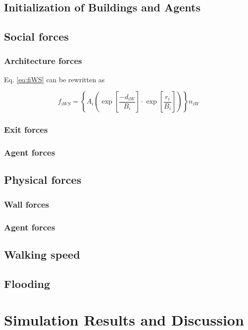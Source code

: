 \documentclass[11pt]{article}
\begin{document}
\subsection{Initialization of Buildings and Agents}
\subsection{Social forces}

\subsubsection{Architecture forces}

Eq. \eqref{eq:fiWS} can be rewritten as

\begin{equation}
	{f_{iWS}} = \left\{ {{A_i}\left( {\exp \left[ {\frac{{ - {d_{iW}}}}{{{B_i}}}} \right] \cdot \exp \left[ {\frac{{{r_i}}}{{{B_i}}}} \right]} \right)} \right\}{n_{iW}}
	\label{eq:fiWS2}
\end{equation}



\subsubsection{Exit forces}
\subsubsection{Agent forces}
\subsection{Physical forces}

\subsubsection{Wall forces}

\subsubsection{Agent forces}
\subsection{Walking speed}
\subsection{Flooding}


\section{Simulation Results and Discussion}
\end{document}

